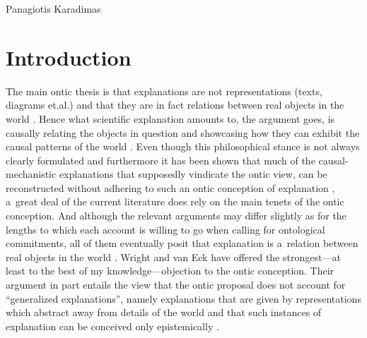 \begin{artengenv}{Panagiotis Karadimas}
\section{Introduction}
\lettrine[loversize=0.13,lines=2,lraise=-0.03,nindent=0em,findent=0.2pt]%
{T}{}he main ontic thesis is that explanations are not representations (texts, diagrams et.al.) and that they are in fact relations between real objects in the world
\parencites[][]{glennan_modeling_2005}[][]{craver_explaining_2007}. %
 Hence what scientific explanation amounts to, the argument goes, is causally relating the objects in question and showcasing how they can exhibit the causal patterns of the world 
\parencites[][]{salmon_scientific_1984}[][]{salmon_four_1989}[][]{salmon_causality_1998}. %
 Even though this philosophical stance is not always clearly formulated 
\parencite[][]{wright_ontic_2015} %
 and furthermore it has been shown that much of the causal-mechanistic explanations that supposedly vindicate the ontic view, can be reconstructed without adhering to such an ontic conception of explanation 
\parencite[][]{wright_mechanistic_2012}, %
 a~great deal of the current literature does rely on the main tenets of the ontic conception. And although the relevant arguments may differ slightly as for the lengths to which each account is willing to go when calling for ontological commitments, all of them eventually posit that explanation is a~relation between real objects in the world 
\parencites[][]{machamer_thinking_2000}[][]{craver_beyond_2005}[][]{sarkar_mechaninsm_2006}[][]{winning_mechanistic_2020}. %
 Wright and van Eck have offered the strongest---at least to the best of my knowledge---objection to the ontic conception. Their argument in part entails the view that the ontic proposal does not account for ``generalized explanations'', namely explanations that are given by representations which abstract away from details of the world and that such instances of explanation can be conceived only epistemically 
\parencite[][p.1019]{wright_ontic_2018}.%



\end{artengenv}
